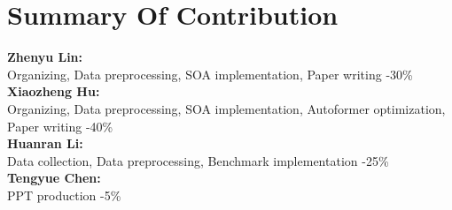 \section{Summary Of Contribution}
\label{sec:summary of contribution}
\begin{flushleft}
	\textbf{Zhenyu Lin:} \\
	Organizing, Data preprocessing, SOA implementation, Paper writing \hfill -30\% \\
	
	\textbf{Xiaozheng Hu:} \\
	Organizing, Data preprocessing, SOA implementation, Autoformer optimization, Paper writing \hfill -40\% \\
	
	\textbf{Huanran Li:} \\
	Data collection, Data preprocessing, Benchmark implementation \hfill -25\% \\
	
	\textbf{Tengyue Chen:} \\
	PPT production \hfill -5\%
\end{flushleft}
